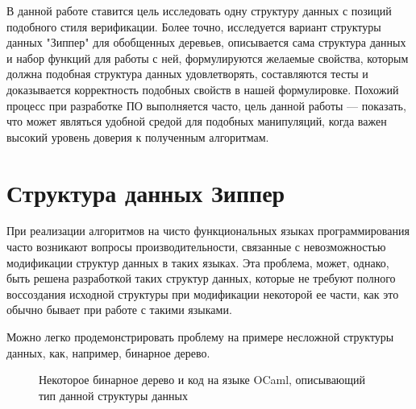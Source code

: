 В данной работе ставится цель исследовать одну структуру данных с позиций подобного стиля верификации. Более точно, исследуется вариант структуры данных "Зиппер" для обобщенных деревьев, описывается сама структура данных и набор функций для работы с ней, формулируются желаемые свойства, которым должна подобная структура данных удовлетворять, составляются тесты и доказывается корректность подобных свойств в нашей формулировке. Похожий процесс при разработке ПО выполняется часто, цель данной работы --- показать, что \tcoq может являться удобной средой для подобных манипуляций, когда важен высокий уровень доверия к полученным алгоритмам.

\newpage

\section{Структура данных Зиппер}

При реализации алгоритмов на чисто функциональных языках программирования часто возникают вопросы производительности, связанные с невозможностью модификации структур данных в таких языках. Эта проблема, может, однако, быть решена разработкой таких структур данных, которые не требуют полного воссоздания исходной структуры при модификации некоторой ее части, как это обычно бывает при работе с такими языками.

Можно легко продемонстрировать проблему на примере несложной структуры данных, как, например, бинарное дерево. 

\begin{figure}[H]
\centering


\caption{Некоторое бинарное дерево и код на языке OCaml, описывающий тип данной структуры данных}
\end{figure}

